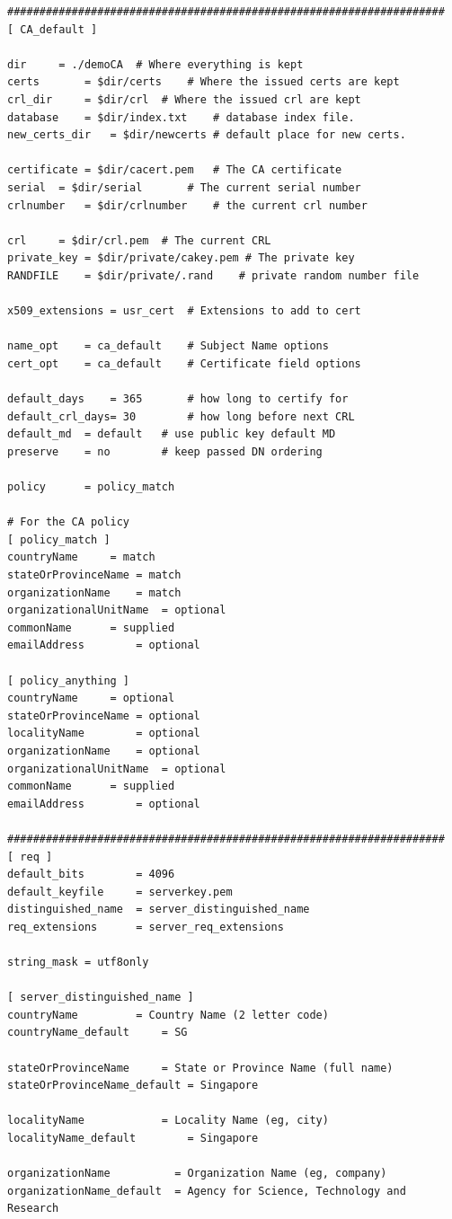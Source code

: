 \documentclass[a4paper,12pt]{article}
\begin{document}
{{\begin{verbatim}
####################################################################
[ CA_default ]

dir		= ./demoCA	# Where everything is kept
certs		= $dir/certs	# Where the issued certs are kept
crl_dir		= $dir/crl	# Where the issued crl are kept
database	= $dir/index.txt	# database index file.
new_certs_dir	= $dir/newcerts # default place for new certs.

certificate	= $dir/cacert.pem 	# The CA certificate
serial	= $dir/serial 		# The current serial number
crlnumber	= $dir/crlnumber	# the current crl number

crl		= $dir/crl.pem	# The current CRL
private_key	= $dir/private/cakey.pem # The private key
RANDFILE	= $dir/private/.rand	# private random number file

x509_extensions	= usr_cert	# Extensions to add to cert

name_opt 	= ca_default	# Subject Name options
cert_opt 	= ca_default	# Certificate field options

default_days	= 365		# how long to certify for
default_crl_days= 30		# how long before next CRL
default_md	= default	# use public key default MD
preserve	= no		# keep passed DN ordering

policy		= policy_match

# For the CA policy
[ policy_match ]
countryName		= match
stateOrProvinceName	= match
organizationName	= match
organizationalUnitName	= optional
commonName		= supplied
emailAddress		= optional

[ policy_anything ]
countryName		= optional
stateOrProvinceName	= optional
localityName		= optional
organizationName	= optional
organizationalUnitName	= optional
commonName		= supplied
emailAddress		= optional

####################################################################
[ req ]
default_bits        = 4096
default_keyfile     = serverkey.pem
distinguished_name  = server_distinguished_name
req_extensions      = server_req_extensions

string_mask = utf8only

[ server_distinguished_name ]
countryName         = Country Name (2 letter code)
countryName_default     = SG

stateOrProvinceName     = State or Province Name (full name)
stateOrProvinceName_default = Singapore

localityName            = Locality Name (eg, city)
localityName_default        = Singapore

organizationName          = Organization Name (eg, company)
organizationName_default  = Agency for Science, Technology and Research


\end{verbatim}}}
\end{document}
